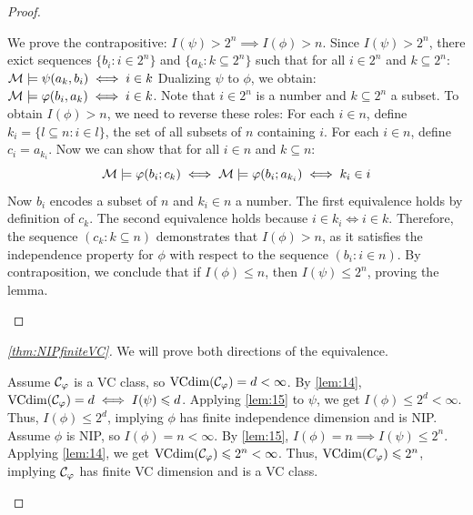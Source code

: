 \begin{proof}
    \begin{outline}
    \0 We prove the contrapositive: $I(\psi) > 2^n \implies I(\phi) > n$. 
        \1 Since $I(\psi) > 2^n$, there exict sequences $\{b_i : i \in 2^n\}$ and $\{a_k : k \subseteq 2^n\}$ such that for all $i \in 2^n$ and $k \subseteq 2^n$:
        $\mathcal{M} \models \psi(a_k, b_i) \iff i \in k$
        \1 Dualizing $\psi$ to $\phi$, we obtain:
        $\mathcal{M} \models \varphi(b_i, a_k) \iff i \in k$.
        Note that $i\in 2^n$ is a number and $k\subseteq 2^n$ a subset. 
        \1 To obtain $I(\phi) > n$, we need to reverse these roles:
            \2 For each $i \in n$, define $k_i = \{l \subseteq n : i \in l\}$, the set of all subsets of $n$ containing $i$. 
            \2 For each $i \in n$, define $c_i = a_{k_i}$.
        \1 Now we can show that for all $i \in n$ and $k \subseteq n$:
        $$\mathcal{M} \models \varphi(b_i; c_k) \iff \mathcal{M} \models \varphi(b_i; a_{k_i}) \iff k_i \in i$$ 
            \2 Now $b_i$ encodes a subset of $n$ and $k_i\in n$ a number.
            \2 The first equivalence holds by definition of $c_k$. 
            \2 The second equivalence holds because $i \in k_i \iff i \in k$.
        \1 Therefore, the sequence $(c_k : k \subseteq n)$ demonstrates that $I(\phi) > n$, as it satisfies the independence property for $\phi$ with respect to the sequence $(b_i : i \in n)$.
    \0 By contraposition, we conclude that if $I(\phi) \leq n$, then $I(\psi) \leq 2^n$, proving the lemma.
    \end{outline}
\end{proof}

\begin{proof}[\cref{thm:NIPfiniteVC}]
We will prove both directions of the equivalence.
\begin{outline}
\1[$a) \implies b)$] Assume $\mathcal{C}_\varphi$ is a VC class, so $\operatorname{VCdim}(\mathcal{C}_\varphi) = d < \infty$.
    \2 By \cref{lem:14}, $\operatorname{VCdim}(\mathcal{C}_\varphi) = d \iff I(\psi) \leqslant d$.
    \2 Applying \cref{lem:15} to $\psi$, we get $I(\phi) \leq 2^d < \infty$.
    \2 Thus, $I(\phi) \leq 2^d$, implying $\phi$ has finite independence dimension and is NIP.
\1[$b) \impliedby a)$] Assume $\phi$ is NIP, so $I(\phi) = n < \infty$.
    \2 By \cref{lem:15}, $I(\phi) = n \implies I(\psi) \leq 2^n$.
    \2 Applying \cref{lem:14}, we get $\operatorname{VCdim}(\mathcal{C}_\varphi) \leqslant 2^n < \infty$.
    \2 Thus, $\operatorname{VCdim}(C_\varphi) \leqslant 2^n$, implying $\mathcal{C}_\varphi$ has finite VC dimension and is a VC class.
\end{outline}
\end{proof}

